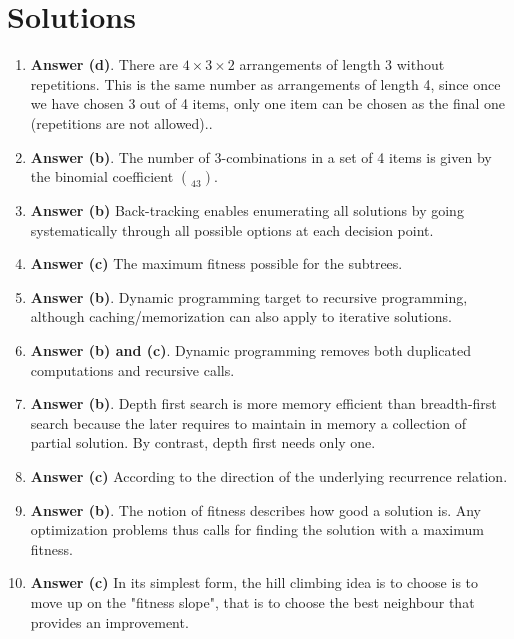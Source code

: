 \documentclass[11pt]{article}
\begin{document}
\section{Solutions}
\label{sec:org16ce9a9}

\begin{enumerate}
\item \textbf{Answer (d)}. There are \(4 \times 3 \times 2\) arrangements of
length 3 without repetitions. This is the same number as
arrangements of length 4, since once we have chosen 3 out of 4
items, only one item can be chosen as the final one (repetitions
are not allowed)..

\item \textbf{Answer (b)}. The number of 3-combinations in a set of 4 items
is given by the binomial coefficient \(\choose{4}{3}\).

\item \textbf{Answer (b)} Back-tracking enables enumerating all solutions by
going systematically through all possible options at each
decision point.

\item \textbf{Answer (c)} The maximum fitness possible for the subtrees.

\item \textbf{Answer (b)}. Dynamic programming target to recursive
programming, although caching/memorization can also apply to
iterative solutions.

\item \textbf{Answer (b) and (c)}. Dynamic programming removes both
duplicated computations and recursive calls.

\item \textbf{Answer (b)}. Depth first search is more memory efficient than
breadth-first search because the later requires to maintain in
memory a collection of partial solution. By contrast, depth first
needs only one.

\item \textbf{Answer (c)} According to the direction of the underlying
recurrence relation.

\item \textbf{Answer (b)}. The notion of fitness describes how good a solution
is. Any optimization problems thus calls for finding the solution
with a maximum fitness.

\item \textbf{Answer (c)} In its simplest form, the hill climbing idea is to
choose is to move up on the "fitness slope", that is to choose
the best neighbour that provides an improvement.
\end{enumerate}
\end{document}
